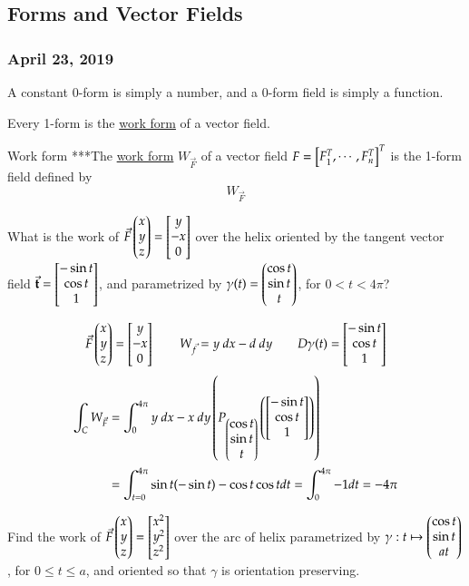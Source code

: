 \subsection{Forms and Vector Fields}
\subsubsection*{April 23, 2019}
A constant $0$-form is simply a number, and a $0$-form field is simply a function. 

Every 1-form is the \ul{work form} of a vector field. 
\begin{defn}{Work form}
	***The \ul{work form} $W_{\vec{F}}$ of a vector field $F=\begin{bmatrix} F_1^T, \cdots, F_n^T \end{bmatrix}^T$ is the 1-form field defined by
	\begin{equation}
		W_{\vec{F}}
	\end{equation}
\end{defn}

\example What is the work of $\vec{F}\begin{pmatrix} x \\ y \\ z \end{pmatrix}=\begin{bmatrix} y \\ -x \\ 0 \end{bmatrix}$ over the helix oriented by the tangent vector field $\vec{\textbf{t}}=\begin{bmatrix} -\sin t \\ \cos t \\ 1 \end{bmatrix}$, and parametrized by $\gamma(t)=\begin{pmatrix} \cos t \\ \sin t \\ t \end{pmatrix}$, for $0<t<4\pi$? 

\[\vec{F}\begin{pmatrix} x \\ y \\ z \end{pmatrix}=\begin{bmatrix} y \\ -x \\ 0 \end{bmatrix}\qquad W_{\vec{f}}=y\ dx -d\ dy\qquad D\gamma(t)=\begin{bmatrix} -\sin t \\ \cos t \\ 1 \end{bmatrix}\]
\begin{align*}
\int_C W_{\vec{F}}&=\int_0^{4\pi} y\ dx - x\ dy \left( P_{\begin{pmatrix} \cos t \\ \sin t \\ t \end{pmatrix}} \left( \begin{bmatrix} -\sin t \\ \cos t \\ 1 \end{bmatrix} \right) \right) \\
&=\int_{t=0}^{4\pi} \sin t (-\sin t) - \cos t \cos t dt = \int_{0}^{4\pi} -1 dt = -4\pi
\end{align*}


 Find the work of $\vec{F}\begin{pmatrix} x \\ y \\ z \end{pmatrix}=\begin{bmatrix} x^2 \\ y^2 \\ z^2 \end{bmatrix}$ over the arc of helix parametrized by $\gamma : t\mapsto \begin{pmatrix} \cos t \\ \sin t \\ at \end{pmatrix}$, for $0\leq t\leq a$, and oriented so that $\gamma$ is orientation preserving. 


